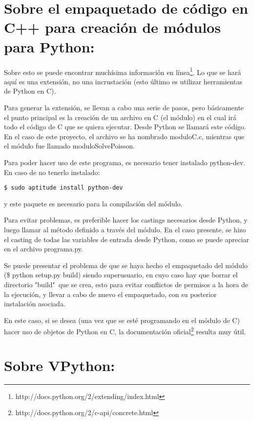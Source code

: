\documentclass[letter]{article}
\begin{document}
\section{Sobre el empaquetado de código en C++ para creación de módulos para Python:}

Sobre esto se puede encontrar muchísima información en línea\footnote{http://docs.python.org/2/extending/index.html}. Lo que se hará aquí es una extensión, no una incrustación (esto último es utilizar herramientas de Python en C).

Para generar la extensión, se llevan a cabo una serie de pasos, pero básicamente el punto principal es la creación de un archivo en C (el módulo) en el cual irá todo el código de C que se quiera ejecutar. Desde Python se llamará este código. En el caso de este proyecto, el archivo se ha nombrado moduloC.c, mientras que el módulo fue llamado moduloSolvePoisson.

Para poder hacer uso de este programa, es necesario tener instalado python-dev. En caso de no tenerlo instalado:

\lstset{language=bash}
\begin{lstlisting}
$ sudo aptitude install python-dev
\end{lstlisting}

y este paquete es necesario para la compilación del módulo.

Para evitar problemas, es preferible hacer los castings necesarios desde Python, y luego llamar al método definido a través del módulo. En el caso presente, se hizo el casting de todas las variables de entrada desde Python, como se puede apreciar en el archivo programa.py.

Se puede presentar el problema de que se haya hecho el empaquetado del módulo (\$ python setup.py build) siendo superusuario, en cuyo caso hay que borrar el directorio "build"\ que se crea, esto para evitar conflictos de permisos a la hora de la ejecución, y llevar a cabo de nuevo el empaquetado, con su posterior instalación asociada.

En este caso, si se desea (una vez que se esté programando en el módulo de C) hacer uso de objetos de Python en C, la documentación oficial\footnote{http://docs.python.org/2/c-api/concrete.html} resulta muy útil.

\section{Sobre VPython:}
\end{document}
